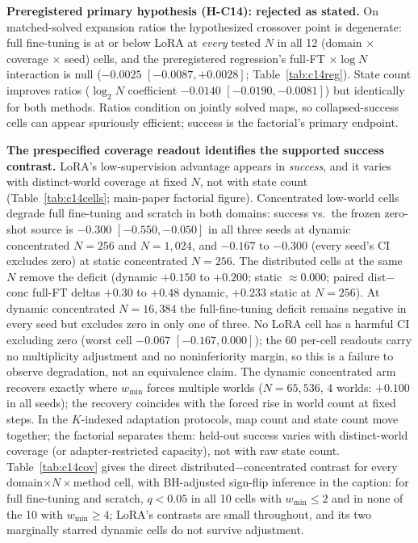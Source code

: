 \documentclass[letterpaper]{article} %
\begin{document}
\textbf{Preregistered primary hypothesis (H-C14): rejected as stated.} On matched-solved expansion ratios the hypothesized crossover point is degenerate: full fine-tuning is at or below LoRA at \emph{every} tested $N$ in all 12 (domain $\times$ coverage $\times$ seed) cells, and the preregistered regression's full-FT $\times \log N$ interaction is null ($-0.0025$ $[-0.0087, +0.0028]$; Table~\ref{tab:c14reg}). State count improves ratios ($\log_2 N$ coefficient $-0.0140$ $[-0.0190, -0.0081]$) but identically for both methods. Ratios condition on jointly solved maps, so collapsed-success cells can appear spuriously efficient; success is the factorial's primary endpoint.

\textbf{The prespecified coverage readout identifies the supported success contrast.} LoRA's low-supervision advantage appears in \emph{success}, and it varies with distinct-world coverage at fixed $N$, not with state count (Table~\ref{tab:c14cells}; main-paper factorial figure). Concentrated low-world cells degrade full fine-tuning and scratch in both domains: success vs.\ the frozen zero-shot source is $-0.300$ $[-0.550,-0.050]$ in all three seeds at dynamic concentrated $N{=}256$ and $N{=}1{,}024$, and $-0.167$ to $-0.300$ (every seed's CI excludes zero) at static concentrated $N{=}256$. The distributed cells at the same $N$ remove the deficit (dynamic $+0.150$ to $+0.200$; static $\approx 0.000$; paired dist$-$conc full-FT deltas $+0.30$ to $+0.48$ dynamic, $+0.233$ static at $N{=}256$). At dynamic concentrated $N{=}16{,}384$ the full-fine-tuning deficit remains negative in every seed but excludes zero in only one of three. No LoRA cell has a harmful CI excluding zero (worst cell $-0.067$ $[-0.167, 0.000]$); the 60 per-cell readouts carry no multiplicity adjustment and no noninferiority margin, so this is a failure to observe degradation, not an equivalence claim. The dynamic concentrated arm recovers exactly where $w_{\min}$ forces multiple worlds ($N{=}65{,}536$, 4 worlds: $+0.100$ in all seeds); the recovery coincides with the forced rise in world count at fixed steps. In the $K$-indexed adaptation protocols, map count and state count move together; the factorial separates them: held-out success varies with distinct-world coverage (or adapter-restricted capacity), not with raw state count. Table~\ref{tab:c14cov} gives the direct distributed$-$concentrated contrast for every domain$\times N\times$method cell, with BH-adjusted sign-flip inference in the caption: for full fine-tuning and scratch, $q{<}0.05$ in all 10 cells with $w_{\min} \leq 2$ and in none of the 10 with $w_{\min} \geq 4$; LoRA's contrasts are small throughout, and its two marginally starred dynamic cells do not survive adjustment.
\end{document}
